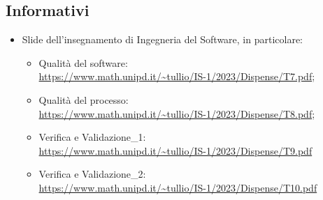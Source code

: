 \subsection{Informativi}
\begin{itemize}
    \item Slide dell’insegnamento di Ingegneria del Software, in particolare:
        \begin{itemize}
            \item Qualità del software: \\ \url{https://www.math.unipd.it/~tullio/IS-1/2023/Dispense/T7.pdf};
            \item Qualità del processo:\\ \url{https://www.math.unipd.it/~tullio/IS-1/2023/Dispense/T8.pdf};
            \item Verifica e Validazione\_1:\\ \url{https://www.math.unipd.it/~tullio/IS-1/2023/Dispense/T9.pdf}
            \item Verifica e Validazione\_2:\\ \url{https://www.math.unipd.it/~tullio/IS-1/2023/Dispense/T10.pdf}
        \end{itemize}
\end{itemize}

